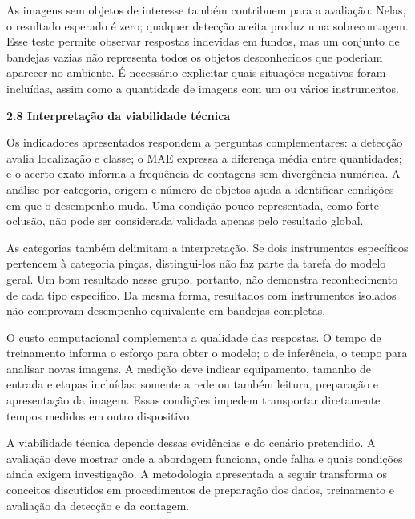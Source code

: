 As imagens sem objetos de interesse também contribuem para a avaliação. Nelas, o resultado esperado é zero; qualquer detecção aceita produz uma sobrecontagem. Esse teste permite observar respostas indevidas em fundos, mas um conjunto de bandejas vazias não representa todos os objetos desconhecidos que poderiam aparecer no ambiente. É necessário explicitar quais situações negativas foram incluídas, assim como a quantidade de imagens com um ou vários instrumentos.

\vspace{\baselineskip}
{}
\noindent\textbf{2.8 Interpretação da viabilidade técnica}\par
\vspace{\baselineskip}

Os indicadores apresentados respondem a perguntas complementares: a detecção avalia localização e classe; o MAE expressa a diferença média entre quantidades; e o acerto exato informa a frequência de contagens sem divergência numérica. A análise por categoria, origem e número de objetos ajuda a identificar condições em que o desempenho muda. Uma condição pouco representada, como forte oclusão, não pode ser considerada validada apenas pelo resultado global.

As categorias também delimitam a interpretação. Se dois instrumentos específicos pertencem à categoria pinças, distingui-los não faz parte da tarefa do modelo geral. Um bom resultado nesse grupo, portanto, não demonstra reconhecimento de cada tipo específico. Da mesma forma, resultados com instrumentos isolados não comprovam desempenho equivalente em bandejas completas.

O custo computacional complementa a qualidade das respostas. O tempo de treinamento informa o esforço para obter o modelo; o de inferência, o tempo para analisar novas imagens. A medição deve indicar equipamento, tamanho de entrada e etapas incluídas: somente a rede ou também leitura, preparação e apresentação da imagem. Essas condições impedem transportar diretamente tempos medidos em outro dispositivo.

A viabilidade técnica depende dessas evidências e do cenário pretendido. A avaliação deve mostrar onde a abordagem funciona, onde falha e quais condições ainda exigem investigação. A metodologia apresentada a seguir transforma os conceitos discutidos em procedimentos de preparação dos dados, treinamento e avaliação da detecção e da contagem.

\endgroup
